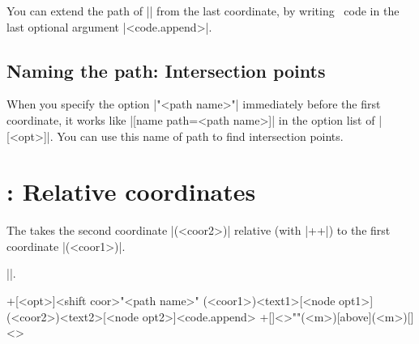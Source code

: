You can extend the path of |\tzline| from the last coordinate, by writing \Tikz\ code in the last optional argument |<code.append>|.

\begin{tzcode}{.3}
\end{tzcode}


\subsection{Naming the path: Intersection points}
\label{ss:tzline:namepath}

When you specify the option |"<path name>"| immediately before the first coordinate, it works like |[name path=<path name>]| in the option list of |[<opt>]|.
You can use this name of path to find intersection points.

\begin{tzcode}{.3}
\end{tzcode}


\section{\protect\cmd{\tzline+}: Relative coordinates}
\label{s:tzline+}

The  \icmd{\tzline+} takes the second coordinate |(<coor2>)| relative (with |++|) to the first coordinate |(<coor1>)|.

 |\tzline|.

\begin{tzdef}{}
\tzline+[<opt>]<shift coor>"<path name>"
        (<coor1>){<text1>}[<node opt1>]
        (<coor2>){<text2>}[<node opt2>]<code.append>
 +[]<>""(<m>){}[above](<m>){}[]<>
\end{tzdef}


